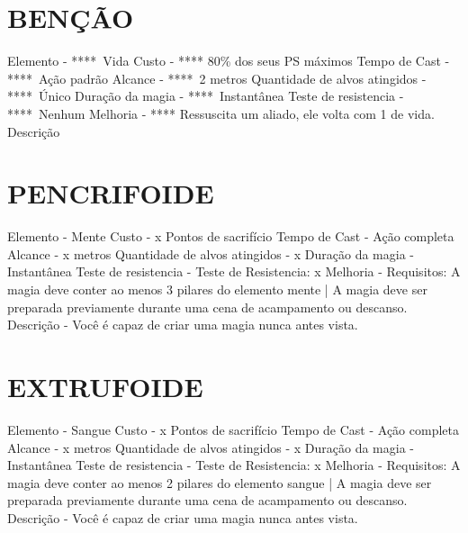 \documentclass{article}%
\begin{document}
%
\section{BENÇÃO}%
\label{sec:BENO}%
Elemento {-} ****~Vida\newline%
Custo {-} **** 80\% dos seus PS máximos\newline%
Tempo de Cast {-} ****~Ação padrão\newline%
Alcance {-} ****~2 metros\newline%
Quantidade de alvos atingidos {-} ****~Único\newline%
Duração da magia {-} ****~Instantânea\newline%
Teste de resistencia {-} ****~Nenhum\newline%
Melhoria {-} **** Ressuscita um aliado, ele volta com 1 de vida.\newline%
Descrição \newline%

%
\section{PENCRIFOIDE}%
\label{sec:PENCRIFOIDE}%
Elemento {-}  Mente\newline%
Custo {-}  x Pontos de sacrifício\newline%
Tempo de Cast {-}  Ação completa\newline%
Alcance {-}  x metros\newline%
Quantidade de alvos atingidos {-}  x\newline%
Duração da magia {-}  Instantânea\newline%
Teste de resistencia {-} Teste de Resistencia: x\newline%
Melhoria {-} Requisitos: A magia deve conter ao menos 3 pilares do elemento mente | A magia deve ser preparada previamente durante uma cena de acampamento ou descanso.\newline%
Descrição {-}  Você é capaz de criar uma magia nunca antes vista.\newline%

%
\section{EXTRUFOIDE}%
\label{sec:EXTRUFOIDE}%
Elemento {-}  Sangue\newline%
Custo {-}  x Pontos de sacrifício\newline%
Tempo de Cast {-}  Ação completa\newline%
Alcance {-}  x metros\newline%
Quantidade de alvos atingidos {-}  x\newline%
Duração da magia {-}  Instantânea\newline%
Teste de resistencia {-} Teste de Resistencia: x\newline%
Melhoria {-} Requisitos: A magia deve conter ao menos 2 pilares do elemento sangue | A magia deve ser preparada previamente durante uma cena de acampamento ou descanso.\newline%
Descrição {-}  Você é capaz de criar uma magia nunca antes vista.\newline%
\end{document}
